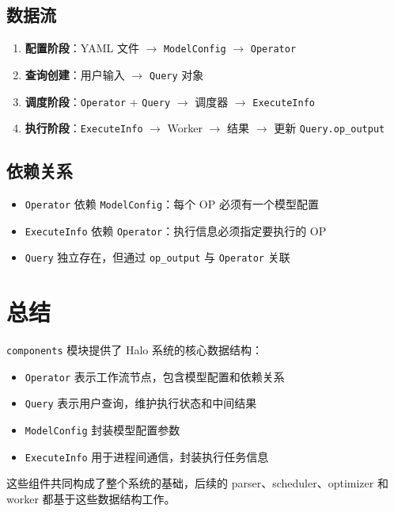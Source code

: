 \documentclass[12pt,a4paper]{article}
\begin{document}
\subsection{数据流}
\begin{enumerate}
    \item \textbf{配置阶段}：YAML 文件 $\rightarrow$ \texttt{ModelConfig} $\rightarrow$ \texttt{Operator}
    \item \textbf{查询创建}：用户输入 $\rightarrow$ \texttt{Query} 对象
    \item \textbf{调度阶段}：\texttt{Operator} + \texttt{Query} $\rightarrow$ 调度器 $\rightarrow$ \texttt{ExecuteInfo}
    \item \textbf{执行阶段}：\texttt{ExecuteInfo} $\rightarrow$ Worker $\rightarrow$ 结果 $\rightarrow$ 更新 \texttt{Query.op_output}
\end{enumerate}

\subsection{依赖关系}
\begin{itemize}
    \item \texttt{Operator} 依赖 \texttt{ModelConfig}：每个 OP 必须有一个模型配置
    \item \texttt{ExecuteInfo} 依赖 \texttt{Operator}：执行信息必须指定要执行的 OP
    \item \texttt{Query} 独立存在，但通过 \texttt{op_output} 与 \texttt{Operator} 关联
\end{itemize}

\section{总结}

\texttt{components} 模块提供了 Halo 系统的核心数据结构：
\begin{itemize}
    \item \texttt{Operator} 表示工作流节点，包含模型配置和依赖关系
    \item \texttt{Query} 表示用户查询，维护执行状态和中间结果
    \item \texttt{ModelConfig} 封装模型配置参数
    \item \texttt{ExecuteInfo} 用于进程间通信，封装执行任务信息
\end{itemize}

这些组件共同构成了整个系统的基础，后续的 parser、scheduler、optimizer 和 worker 都基于这些数据结构工作。
\end{document}
